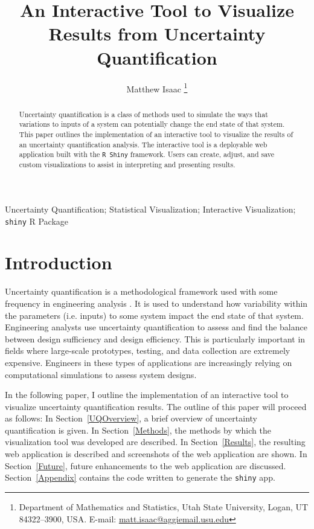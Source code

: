 \documentclass[11pt]{asaproc}\usepackage[]{graphicx}\usepackage[]{color}
\title{An Interactive Tool to Visualize Results from Uncertainty Quantification}
\author{Matthew Isaac \thanks{Department of Mathematics and Statistics, Utah State University, Logan, UT 84322--3900, USA. 
E-mail: \url{matt.isaac@aggiemail.usu.edu}}
}
\begin{document}
\renewcommand{\topfraction}{1.0}
\renewcommand{\bottomfraction}{1.0}
\renewcommand{\textfraction}{0.0}
\renewcommand{\floatpagefraction}{1.0}
\renewcommand{\dbltopfraction}{1.0}


\maketitle

\begin{abstract}
Uncertainty quantification is a class of methods used to simulate the ways that variations to inputs of a system can potentially change the end state of that system. This paper outlines the implementation of an interactive tool to visualize the results of an uncertainty quantification analysis. The interactive tool is a deployable web application built with the {\tt R Shiny} framework. Users can create, adjust, and save custom visualizations to assist in interpreting and presenting results. 
\end{abstract}

\begin{keywords}Uncertainty Quantification; Statistical Visualization; Interactive Visualization; {\tt shiny} R Package
\end{keywords}


\section{Introduction}
\label{Introduction}

Uncertainty quantification is a methodological framework used with some frequency in engineering analysis \citep{EW2018}. It is used to understand how variability  within the parameters (i.e. inputs) to some system impact the end state of that system. Engineering analysts use uncertainty quantification to assess and find the balance between design sufficiency and design efficiency. This is particularly important in fields where large-scale prototypes, testing, and data collection are extremely expensive. Engineers in these types of applications are increasingly relying on computational simulations to assess system designs.

In the following paper, I outline the implementation of an interactive tool to visualize uncertainty quantification results. The outline of this paper will proceed as follows: In Section~\ref{UQOverview}, a brief overview of uncertainty quantification is given. In Section~\ref{Methods}, the methods by which the visualization tool was developed are described. In Section~\ref{Results}, the resulting web application is described and screenshots of the web application are shown. In Section~\ref{Future}, future enhancements to the web application are discussed. Section~\ref{Appendix} contains the code written to generate the {\tt shiny} app.
\end{document}
